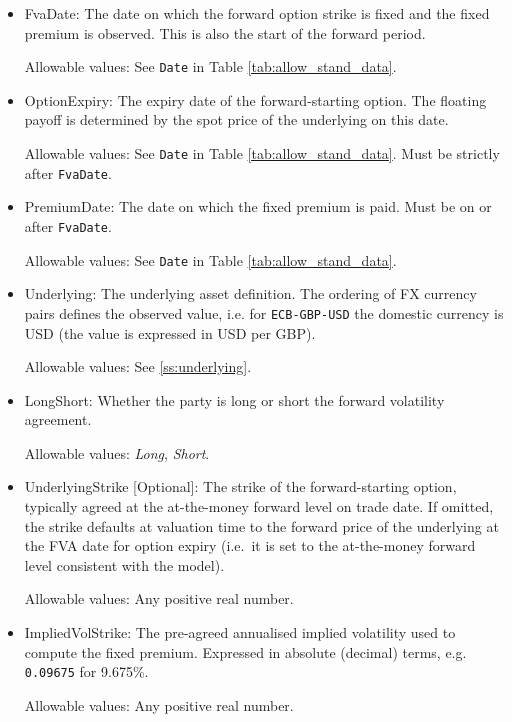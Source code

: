 \begin{itemize}
\item FvaDate: The date on which the forward option strike is fixed and the fixed premium is observed. This is also
  the start of the forward period.

  Allowable values: See \lstinline!Date! in Table \ref{tab:allow_stand_data}.

\item OptionExpiry: The expiry date of the forward-starting option. The floating payoff is determined by the spot
  price of the underlying on this date.

  Allowable values: See \lstinline!Date! in Table \ref{tab:allow_stand_data}. Must be strictly after \lstinline!FvaDate!.

\item PremiumDate: The date on which the fixed premium is paid. Must be on or after \lstinline!FvaDate!.

  Allowable values: See \lstinline!Date! in Table \ref{tab:allow_stand_data}.

\item Underlying: The underlying asset definition. The ordering of FX currency pairs defines the observed value, i.e.
  for \lstinline!ECB-GBP-USD! the domestic currency is USD (the value is expressed in USD per GBP).

  Allowable values: See \ref{ss:underlying}.

\item LongShort: Whether the party is long or short the forward volatility agreement.

  Allowable values: \emph{Long}, \emph{Short}.

\item UnderlyingStrike [Optional]: The strike of the forward-starting option, typically agreed at the at-the-money
  forward level on trade date. If omitted, the strike defaults at valuation time to the forward price of the underlying
  at the FVA date for option expiry (i.e.\ it is set to the at-the-money forward level consistent with the model).

  Allowable values: Any positive real number.

\item ImpliedVolStrike: The pre-agreed annualised implied volatility used to compute the fixed premium. Expressed in
  absolute (decimal) terms, e.g. \lstinline!0.09675! for 9.675\%.

  Allowable values: Any positive real number.


\end{itemize}
